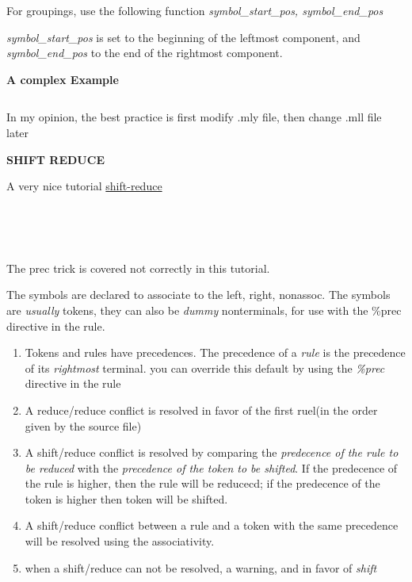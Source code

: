 For groupings, use the following function \textit{symbol\_start\_pos,
  symbol\_end\_pos}

\textit{symbol\_start\_pos} is set to the beginning of the leftmost
component, and \textit{symbol\_end\_pos} to the end of the rightmost component.

\textbf{A complex Example}

\inputminted[fontsize=\scriptsize, fontsize=\scriptsize, ]{ocaml}{code/calc/calc_compl.mly}


In my opinion, the best practice is first modify .mly file, then
change .mll file later


\textbf{SHIFT REDUCE }
  
A very nice tutorial
\href{http://www.cs.uiuc.edu/class/sp10/cs421/lectures/lecture%2010%20supp.pdf}{shift-reduce}

\inputminted[fontsize=\scriptsize, fontsize=\scriptsize, ]{ocaml}{code/shift_reduce/s1.mly}
\inputminted[fontsize=\scriptsize, fontsize=\scriptsize, ]{ocaml}{code/shift_reduce/s2.mly}
\inputminted[fontsize=\scriptsize, fontsize=\scriptsize, ]{ocaml}{code/shift_reduce/s3.mly}
\inputminted[fontsize=\scriptsize, fontsize=\scriptsize, ]{ocaml}{code/shift_reduce/s4.mly}
\inputminted[fontsize=\scriptsize, fontsize=\scriptsize, ]{ocaml}{code/shift_reduce/s5.mly}

The prec trick is covered not correctly in this tutorial.
        
The symbols are declared to associate to the left, right,
nonassoc. The symbols are \textit{usually} tokens, they can
also be \textit{dummy} nonterminals, for use with the \%prec
directive in the rule.

\begin{enumerate}
\item Tokens and rules have precedences. The precedence of a
\textit{rule} is the precedence of its \textit{rightmost}
terminal. you can override this default by using the \textit{\%prec}
directive in the rule
\item A reduce/reduce conflict is resolved in favor of the first
ruel(in the order given by the source file)
\item A shift/reduce conflict is resolved by comparing the
\textit{predecence of the rule to be reduced} with the
\textit{precedence of the token to be shifted}. If the predecence of
the rule is higher, then the rule will be reducecd; if the predecence
of the token is higher then token will be shifted.
\item A shift/reduce conflict between a rule and a token with
the same precedence will be resolved using the associativity.
\item when a shift/reduce can not be resolved, a warning, and
in favor of \textit{shift}
\end{enumerate}


